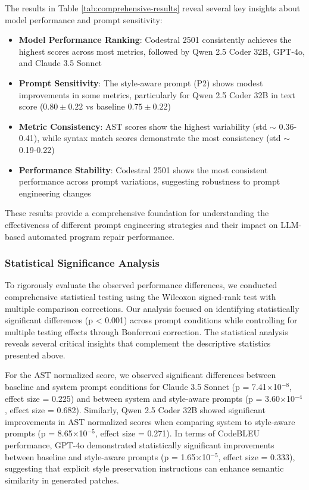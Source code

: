 The results in Table \ref{tab:comprehensive-results} reveal several key insights about model performance and prompt sensitivity:

\begin{itemize}
    \item \textbf{Model Performance Ranking}: Codestral 2501 consistently achieves the highest scores across most metrics, followed by Qwen 2.5 Coder 32B, GPT-4o, and Claude 3.5 Sonnet
    \item \textbf{Prompt Sensitivity}: The style-aware prompt (P2) shows modest improvements in some metrics, particularly for Qwen 2.5 Coder 32B in text score ($0.80 \pm 0.22$ vs baseline $0.75 \pm 0.22$)
    \item \textbf{Metric Consistency}: AST scores show the highest variability (std $\sim$ 0.36-0.41), while syntax match scores demonstrate the most consistency (std $\sim$ 0.19-0.22)
    \item \textbf{Performance Stability}: Codestral 2501 shows the most consistent performance across prompt variations, suggesting robustness to prompt engineering changes
\end{itemize}

These results provide a comprehensive foundation for understanding the effectiveness of different prompt engineering strategies and their impact on LLM-based automated program repair performance.

\subsubsection{Statistical Significance Analysis}
To rigorously evaluate the observed performance differences, we conducted comprehensive statistical testing using the Wilcoxon signed-rank test with multiple comparison corrections. Our analysis focused on identifying statistically significant differences (p < 0.001) across prompt conditions while controlling for multiple testing effects through Bonferroni correction. The statistical analysis reveals several critical insights that complement the descriptive statistics presented above.

For the AST normalized score, we observed significant differences between baseline and system prompt conditions for Claude 3.5 Sonnet (p = 7.41$\times$10$^{-8}$, effect size = 0.225) and between system and style-aware prompts (p = 3.60$\times$10$^{-4}$, effect size = 0.682). Similarly, Qwen 2.5 Coder 32B showed significant improvements in AST normalized scores when comparing system to style-aware prompts (p = 8.65$\times$10$^{-5}$, effect size = 0.271). In terms of CodeBLEU performance, GPT-4o demonstrated statistically significant improvements between baseline and style-aware prompts (p = 1.65$\times$10$^{-5}$, effect size = 0.333), suggesting that explicit style preservation instructions can enhance semantic similarity in generated patches.

